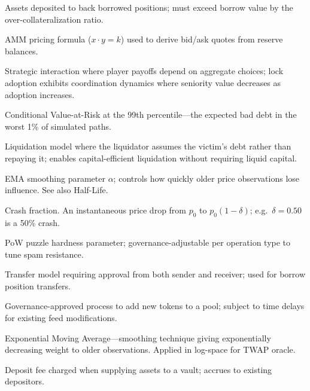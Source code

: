 \documentclass[10pt,a4paper,twocolumn]{article}
\theoremstyle{definition}
\theoremstyle{plain}
\theoremstyle{remark}
\begin{document}
\begin{description}[style=nextline, leftmargin=2.5em, labelindent=0em, font=\normalfont\bfseries]
\item[Collateral] Assets deposited to back borrowed positions; must exceed borrow value by the over-collateralization ratio.

\item[Constant Product] AMM pricing formula ($x \cdot y = k$) used to derive bid/ask quotes from reserve balances.

\item[Coordination Game] Strategic interaction where player payoffs depend on aggregate choices; lock adoption exhibits coordination dynamics where seniority value decreases as adoption increases.

\item[$\text{CVaR}(99\%)$\,$\dagger$] Conditional Value-at-Risk at the 99th percentile---the expected bad debt in the worst 1\% of simulated paths.


\item[Debt Assumption] Liquidation model where the liquidator assumes the victim's debt rather than repaying it; enables capital-efficient liquidation without requiring liquid capital.

\item[Decay Factor] EMA smoothing parameter $\alpha$; controls how quickly older price observations lose influence. See also Half-Life.

\item[$\delta$\,$\dagger$] Crash fraction. An instantaneous price drop from $p_0$ to $p_0(1{-}\delta)$; e.g.\ $\delta = 0.50$ is a 50\% crash.

\item[Difficulty] PoW puzzle hardness parameter; governance-adjustable per operation type to tune spam resistance.

\item[Dual Approval] Transfer model requiring approval from both sender and receiver; used for borrow position transfers.


\item[Enlisting] Governance-approved process to add new tokens to a pool; subject to time delays for existing feed modifications.

\item[EMA] Exponential Moving Average---smoothing technique giving exponentially decreasing weight to older observations. Applied in log-space for TWAP oracle.

\item[Entry Fee] Deposit fee charged when supplying assets to a vault; accrues to existing depositors.


\end{description}
\end{document}
